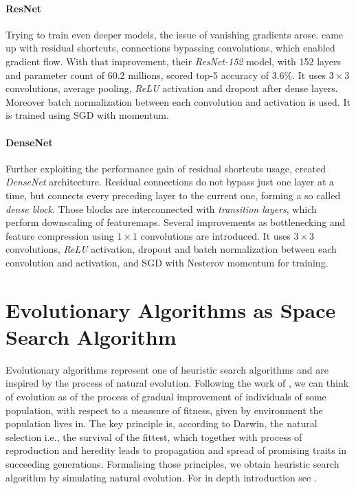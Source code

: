 \paragraph{ResNet}
Trying to train even deeper models, the issue of vanishing gradients arose. \cite{DBLP:journals/corr/HeZRS15} came up with residual shortcuts, connections bypassing convolutions, which enabled gradient flow. With that improvement, their \emph{ResNet-152} model, with 152 layers and parameter count of $60.2$ millions, scored top-5 accuracy of $3.6\%$. It uses $3 \times 3$ convolutions, average pooling, \emph{ReLU} activation and dropout after dense layers. Moreover batch normalization between each convolution and activation is used. It is trained using SGD with momentum.

\paragraph{DenseNet}
\label{sec:densenet}
Further exploiting the performance gain of residual shortcuts usage, \cite{DBLP:journals/corr/HuangLW16a} created \emph{DenseNet} architecture. Residual connections do not bypass just one layer at a time, but connects every preceding layer to the current one, forming a so called \emph{dense block}. Those blocks are interconnected with \emph{transition layers}, which perform downscaling of featuremaps. Several improvements as bottlenecking and feature compression using $1 \times 1$ convolutions are introduced. It uses $3 \times 3$ convolutions, \emph{ReLU} activation, dropout and batch normalization between each convolution and activation, and SGD with Nesterov momentum for training.

\section{Evolutionary Algorithms as Space Search Algorithm}
\label{sec:ea_theory}
Evolutionary algorithms represent one of heuristic search algorithms and are inspired by the process of natural evolution. Following the work of \cite{darwin1859}, we can think of evolution as of the process of gradual improvement of individuals of some population, with respect to a meassure of fitness, given by environment the population lives in. The key principle is, according to Darwin, the natural selection i.e., the survival of the fittest, which together with process of reproduction and heredity leads to propagation and spread of promising traits in succeeding generations. Formalising those principles, we obtain heuristic search algorithm by simulating natural evolution. For in depth introduction see \cite{evolution}.

